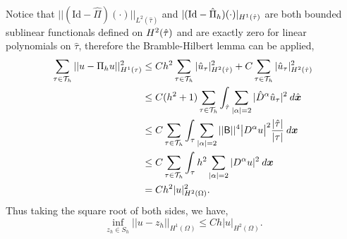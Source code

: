 \documentclass[11pt]{article}
\newcommand{\bs}{\boldsymbol}
\begin{document}
Notice that $||(\text{Id} - \widehat{\Pi})(\cdot)||_{L^2(\hat{\tau})}$ and $|(\text{Id} - \Hat{\Pi}_h)(\cdot)|_{H^1(\hat{\tau})}$ are both bounded sublinear functionals defined on $H^2(\Hat{\tau})$ and are exactly zero for linear polynomials on $\hat{\tau}$, therefore the Bramble-Hilbert lemma can be applied,
\begin{align*}
    \sum_{\tau \in \mathcal{T}_h} ||u - \Pi_h u||^2_{H^1(\tau)} &\leq Ch^2 \sum_{\tau \in \mathcal{T}_h} |\hat{u}_\tau|^2_{H^2(\Hat{\tau})} + C \sum_{\tau \in \mathcal{T}_h} |\hat{u}_\tau|^2_{H^2(\Hat{\tau})} \\
	&\leq C (h^2 + 1) \sum_{\tau \in \mathcal{T}_h}  \int_{\Hat{\tau}} \sum_{|\alpha| = 2} |\Hat{D}^\alpha \Hat{u}_\tau|^2 \: d\Hat{\bs{x}} \\
	&\leq C \sum_{\tau \in \mathcal{T}_h}  \int_{\tau} \sum_{|\alpha| = 2} ||\mathsf{B}||^4 \big|  D^\alpha u \big|^2 \frac{|\Hat{\tau}|}{|\tau|} \: d\bs{x} \\
	&\leq C \sum_{\tau \in \mathcal{T}_h}  \int_\tau h^2  \sum_{|\alpha|=2} |D^\alpha u|^2 \: d\bs{x} \\
    &= C h^2 |u|^2_{H^2(\Omega)}.
\end{align*}
Thus taking the square root of both sides, we have,
\begin{equation*}
	\inf_{z_h \in S_h} ||u - z_h||_{H^1(\Omega)} \leq Ch |u|_{H^2(\Omega)}.
\end{equation*}
\end{document}
